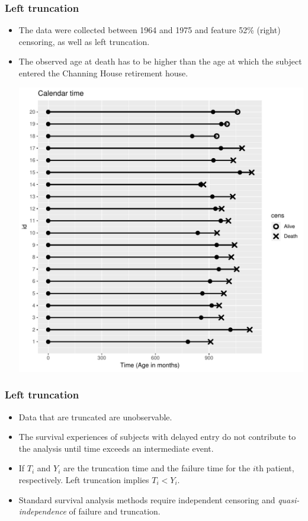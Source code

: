 \documentclass[10pt]{beamer}\usepackage[]{graphicx}\usepackage[]{color}
\newcommand{\empr}[1]{{\emph{\color{red}#1}}}
\begin{document}
\begin{frame}
  \frametitle{Left truncation}
  \begin{itemize}    
  \item The data were collected between 1964 and 1975 and feature 52\% (right) censoring, as well as left truncation. 
  \item The observed age at death has to be higher than the age at which the subject entered the Channing House retirement house.
    \begin{center}
    \includegraphics[scale = .3]{channing}
    \end{center}
  \end{itemize}  
\end{frame}

\begin{frame}
  \frametitle{Left truncation}
  \begin{itemize}
  \item Data that are truncated are unobservable.
  \item The survival experiences of subjects with delayed entry do not contribute to the analysis until time exceeds an intermediate event. 
  \item If $T_i$ and $Y_i$ are the truncation time and the failure time for the $i$th patient, respectively. Left truncation implies $T_i < Y_i$.
  \item Standard survival analysis methods require independent censoring and \empr{quasi-independence} of failure and truncation.
  \end{itemize}  
\end{frame}


  
\end{document}
